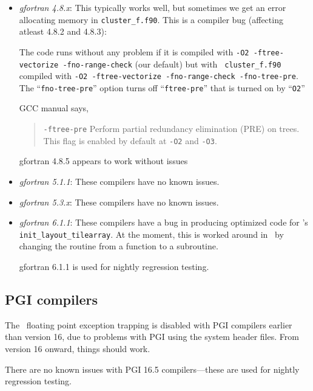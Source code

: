 \begin{itemize}

\item {\em gfortran 4.8.x}: This typically works well, but sometimes we get
an error allocating memory in {\tt cluster\_f.f90}.  This
is a compiler bug (affecting atleast 4.8.2 and 4.8.3):

The code runs without any problem if it is compiled with {\tt -O2
-ftree-vectorize -fno-range-check} (our default) but with {\tt
cluster\_f.f90} compiled with {\tt -O2 -ftree-vectorize
-fno-range-check -fno-tree-pre}.  The ``{\tt fno-tree-pre}'' option
turns off ``{\tt ftree-pre}'' that is turned on by ``{\tt O2}''
 
GCC manual says,

\begin{quote}
{\tt -ftree-pre} \newline
Perform partial redundancy elimination (PRE) on trees. This flag is enabled by default at {\tt -O2} and {\tt -O3}.
\end{quote}

gfortran 4.8.5 appears to work without issues


\item {\em gfortran 5.1.1}: These compilers have no known issues.

\item {\em gfortran 5.3.x}: These compilers have no known issues.

\item {\em gfortran 6.1.1}: These compilers have a bug in producing
  optimized code for \boxlib's {\tt init\_layout\_tilearray}.  At the
  moment, this is worked around in \boxlib\ by changing the routine
  from a function to a subroutine.


  gfortran 6.1.1 is used for nightly regression testing.

\end{itemize}

\subsection{PGI compilers}

The \boxlib\ floating point exception trapping is disabled with PGI
compilers earlier than version 16, due to problems with PGI using the
system header files.  From version 16 onward, things should work.

There are no known issues with PGI 16.5 compilers---these are used
for nightly regression testing.


